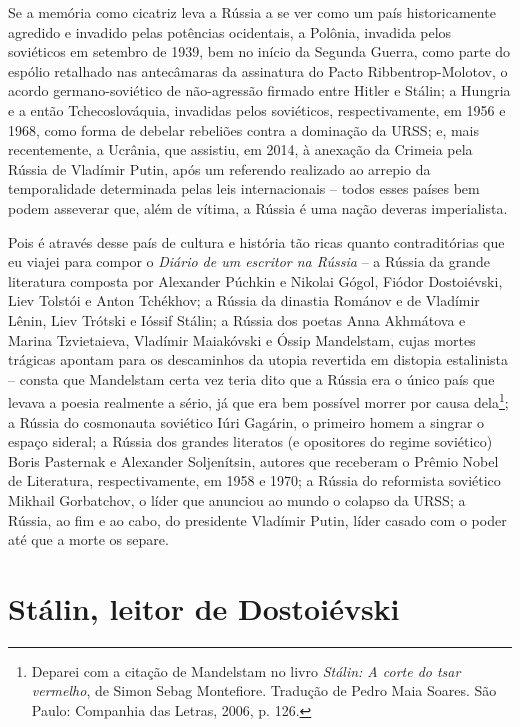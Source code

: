 Se a memória como cicatriz leva a Rússia a se ver como um país
historicamente agredido e invadido pelas potências ocidentais, a
Polônia, invadida pelos soviéticos em setembro de 1939, bem no início da
Segunda Guerra, como parte do espólio retalhado nas antecâmaras da
assinatura do Pacto Ribbentrop-Molotov, o acordo germano-soviético de
não-agressão firmado entre Hitler e Stálin; a Hungria e a então
Tchecoslováquia, invadidas pelos soviéticos, respectivamente, em 1956 e
1968, como forma de debelar rebeliões contra a dominação da URSS; e,
mais recentemente, a Ucrânia, que assistiu, em 2014, à anexação da
Crimeia pela Rússia de Vladímir Putin, após um referendo realizado ao
arrepio da temporalidade determinada pelas leis internacionais -- todos
esses países bem podem asseverar que, além de vítima, a Rússia é uma
nação deveras imperialista.

Pois é através desse país de cultura e história tão ricas quanto
contraditórias que eu viajei para compor o \emph{Diário de um escritor
na Rússia} -- a Rússia da grande literatura composta por Alexander
Púchkin e Nikolai Gógol, Fiódor Dostoiévski, Liev Tolstói e Anton
Tchékhov; a Rússia da dinastia Románov e de Vladímir Lênin, Liev Trótski
e Ióssif Stálin; a Rússia dos poetas Anna Akhmátova e Marina
Tzvietaieva, Vladímir Maiakóvski e Óssip Mandelstam, cujas mortes
trágicas apontam para os descaminhos da utopia revertida em distopia
estalinista -- consta que Mandelstam certa vez teria dito que a Rússia
era o único país que levava a poesia realmente a sério, já que era bem
possível morrer por causa dela\footnote{Deparei com a citação de
  Mandelstam no livro \emph{Stálin: A corte do tsar vermelho}, de Simon
  Sebag Montefiore. Tradução de Pedro Maia Soares. São Paulo: Companhia
  das Letras, 2006, p. 126.}; a Rússia do cosmonauta soviético Iúri
Gagárin, o primeiro homem a singrar o espaço sideral; a Rússia dos
grandes literatos (e opositores do regime soviético) Boris Pasternak e
Alexander Soljenítsin, autores que receberam o Prêmio Nobel de
Literatura, respectivamente, em 1958 e 1970; a Rússia do reformista
soviético Mikhail Gorbatchov, o líder que anunciou ao mundo o colapso da
URSS; a Rússia, ao fim e ao cabo, do presidente Vladímir Putin, líder
casado com o poder até que a morte os separe.

\chapter*{Stálin, leitor de Dostoiévski}

